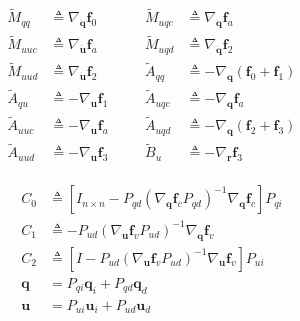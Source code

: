 \documentclass[smallcondensed]{svjour3}                     %
\begin{document}
\begin{align}
\label{eq:quant_to_compute}
  \begin{array}{llcll}
    \tilde{M}_{qq}  &\triangleq \nabla_{\bm{\dot{q}}}\bm{f}_0 & \quad &
    \tilde{M}_{uqc} &\triangleq \nabla_{\bm{\dot{q}}}\bm{f}_a \\
    \tilde{M}_{uuc} &\triangleq \nabla_{\bm{\dot{u}}}\bm{f}_a & \quad &
    \tilde{M}_{uqd} &\triangleq \nabla_{\bm{\dot{q}}}\bm{f}_2 \\
    \tilde{M}_{uud} &\triangleq \nabla_{\bm{\dot{u}}}\bm{f}_2 & \quad &
    \tilde{A}_{qq}  &\triangleq -\nabla_{\bm{q}}(\bm{f}_0 + \bm{f}_1) \\
    \tilde{A}_{qu}  &\triangleq -\nabla_{\bm{u}}\bm{f}_1 & \quad &
    \tilde{A}_{uqc} &\triangleq - \nabla_{\bm{q}} \bm{f}_a \\
    \tilde{A}_{uuc} &\triangleq - \nabla_{\bm{u}} \bm{f}_a & \quad &
    \tilde{A}_{uqd} &\triangleq - \nabla_{\bm{q}} (\bm{f}_2 + \bm{f}_3) \\
    \tilde{A}_{uud} &\triangleq - \nabla_{\bm{u}} \bm{f}_3 & \quad &
    \tilde{B}_{u}   &\triangleq -\nabla_{\bm{r}}\bm{f}_{3}
  \end{array}
\end{align}

\begin{align}
  \label{eq:C_0}
  C_0 &\triangleq \left[ I_{n \times n} - P_{qd}(\nabla_{\bm{q}}
    \bm{f}_{c} P_{qd})^{-1} \nabla_{\bm{q}} \bm{f}_{c} \right] P_{qi}\\
  \label{eq:C_1}
  C_1 &\triangleq -P_{ud}(\nabla_{\bm{u}} \bm{f}_{v} P_{ud})^{-1}
  \nabla_{\bm{q}} \bm{f}_{v} \\
  \label{eq:C_2}
  C_2 &\triangleq \left[I - P_{ud} (\nabla_{\bm{u}}\bm{f}_{v} P_{ud})^{-1} \nabla_{\bm{u}}
    \bm{f}_{v} \right] P_{ui}\\
  \label{eq:Pq}
  \bm{q} &= P_{qi} \bm{q}_{i} + P_{qd} \bm{q}_{d} \\
  \label{eq:Pu}
  \bm{u} &= P_{ui} \bm{u}_{i} + P_{ud} \bm{u}_{d}
\end{align}
\end{document}
